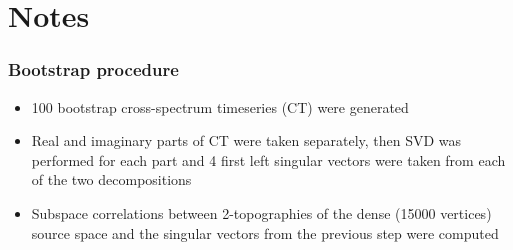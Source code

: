\documentclass{article}
\begin{document}






\justify
\section{Notes}

\subsubsection{Bootstrap procedure}
\begin{itemize}
    \item 100 bootstrap cross-spectrum timeseries (CT) were generated
    \item Real and imaginary parts of CT were taken separately, then
          SVD was performed for each part and 4 first left singular vectors were taken
          from each of the two decompositions
    \item Subspace correlations between 2-topographies of the dense (15000 vertices)
          source space and the singular vectors from the previous step were computed
\end{itemize}
\end{document}

